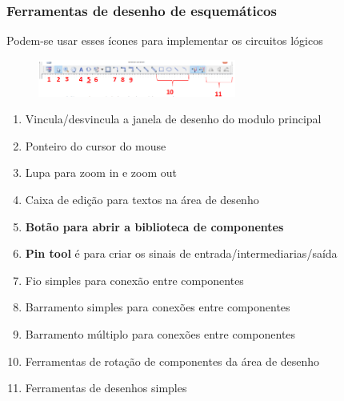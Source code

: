 \documentclass{CPSPresentation}
\begin{document}
\begin{frame}
	\frametitle{Ferramentas de desenho de esquemáticos}
	
	\begin{block}{}
		\justifying
		Podem-se usar esses ícones para implementar os circuitos lógicos
	\end{block}
	
	\begin{figure}[h]
		\centering
		\includegraphics[width=0.58\textwidth]{quartus/fig17.png}
	\end{figure}
	
	\begin{enumerate}
		\item Vincula/desvincula a janela de desenho do modulo principal
		\item Ponteiro do cursor do mouse
		\item Lupa para zoom in e zoom out
		\item Caixa de edição para textos na área de desenho
		\item \textbf{Botão para abrir a biblioteca de componentes}
		\item \textbf{Pin tool} é para criar os sinais de entrada/intermediarias/saída
		\item Fio simples para conexão entre componentes
		\item Barramento simples para conexões entre componentes
		\item Barramento múltiplo para conexões entre componentes
		\item Ferramentas de rotação de componentes da área de desenho
		\item Ferramentas de desenhos simples
		
		
	\end{enumerate}
	
\end{frame}
\end{document}
